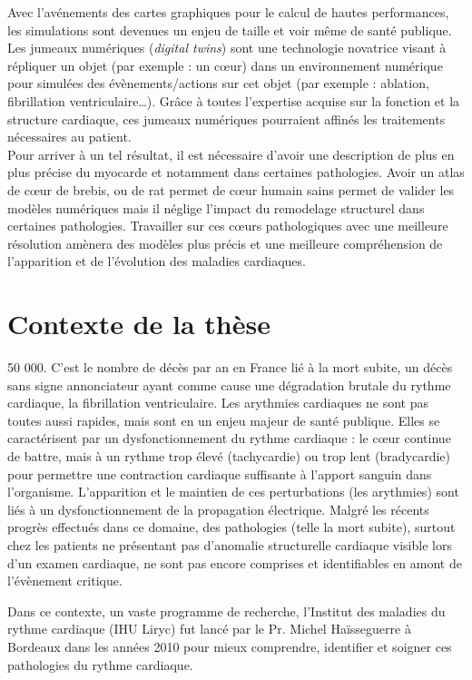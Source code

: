 Avec l’avénements des cartes graphiques pour le calcul de hautes performances, les simulations sont devenues un enjeu de taille et voir même de santé publique. Les jumeaux numériques (\textit{digital twins}) sont une technologie novatrice visant à répliquer un objet (par exemple : un cœur) dans un environnement numérique pour simulées des évènements/actions sur cet objet (par exemple : ablation, fibrillation ventriculaire…). Grâce à toutes l’expertise acquise sur la fonction et la structure cardiaque, ces jumeaux numériques pourraient affinés les traitements nécessaires au patient. 
\\
Pour arriver à un tel résultat, il est nécessaire d’avoir une description de plus en plus précise du myocarde et notamment dans certaines pathologies. Avoir un atlas de cœur de brebis, ou de rat permet de cœur humain sains permet de valider les modèles numériques mais il néglige l’impact du remodelage structurel dans certaines pathologies. Travailler sur ces cœurs pathologiques avec une meilleure résolution amènera des modèles plus précis et une meilleure compréhension de l'apparition et de l’évolution des maladies cardiaques.

\section{Contexte de la thèse}
50 000. C’est le nombre de décès par an en France lié à la mort subite, un décès sans signe annonciateur ayant comme cause une dégradation brutale du rythme cardiaque, la fibrillation ventriculaire. Les arythmies cardiaques ne sont pas toutes aussi rapides, mais sont en un enjeu majeur de santé publique. Elles se caractérisent par un dysfonctionnement du rythme cardiaque : le cœur continue de battre, mais à un rythme trop élevé (tachycardie) ou trop lent (bradycardie) pour permettre une contraction cardiaque suffisante à l’apport sanguin dans l’organisme. L'apparition et le maintien de ces perturbations (les arythmies) sont liés à un dysfonctionnement de la propagation électrique. Malgré les récents progrès effectués dans ce domaine, des pathologies (telle la mort subite), surtout chez les patients ne présentant pas d’anomalie structurelle cardiaque visible lors d’un examen cardiaque, ne sont pas encore comprises  et identifiables en amont de l’évènement critique.

Dans ce contexte, un vaste programme de recherche, l’Institut des maladies du rythme cardiaque (IHU Liryc) fut lancé par le Pr. Michel Haïsseguerre à Bordeaux dans les années 2010 pour mieux comprendre, identifier et soigner ces pathologies du rythme cardiaque. 

